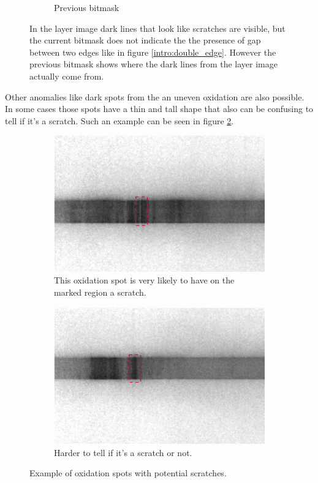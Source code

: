 \begin{figure}[!h]
\begin{subfigure}{.33\textwidth}
  \caption{Previous bitmask}
\end{subfigure}
\caption{In the layer image dark lines that look like scratches are visible, but the current bitmask does not indicate the the presence of gap between two edges like in figure \ref{intro:double_edge}. However the previous bitmask shows where the dark lines from the layer image actually come from.}
\label{intro:image_artifacts}
\end{figure}

Other anomalies like dark spots from the an uneven oxidation are also possible. In some cases those spots have a thin and tall shape that also can be confusing to tell if it's a scratch. Such an example can be seen in figure \ref{intro:layer_oxidation}.


\begin{figure}[!h]
\centering
\begin{subfigure}{0.75\textwidth}
  \centering
  \includegraphics[width=\linewidth]{images/introduction/oxidation/layer_00010_cropped_marked}
  \caption{This oxidation spot is very likely to have on the marked region a scratch. }
\end{subfigure}
\begin{subfigure}{0.75\textwidth}
  \centering
  \includegraphics[width=\linewidth]{images/introduction/oxidation/layer_00016_cropped_marked}
  \caption{Harder to tell if it's a scratch or not.}
\end{subfigure}
\caption{Example of oxidation spots with potential scratches.}
\label{intro:layer_oxidation}
\end{figure}


